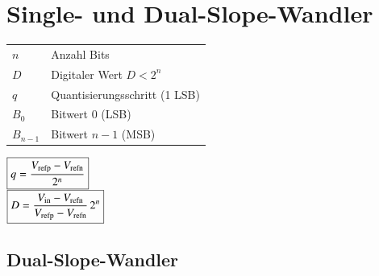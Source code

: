 
\section{Single- und Dual-Slope-Wandler}

\begin{minipage}{0.68\linewidth}
    \begin{tabular}{ll}
        $n$ & Anzahl Bits \\
        $D$ & Digitaler Wert \quad $D < 2^n$ \\
        $q$ & Quantisierungsschritt (1 LSB) \\
        $B_0$ & Bitwert 0 (LSB) \\
        $B_{n-1}$ & Bitwert $n-1$ (MSB)
    \end{tabular}
\end{minipage}
\hfill
\begin{minipage}{0.3\linewidth}
    $ \boxed{ q = \frac{V_{\rm refp} - V_{\rm refn}}{2^n} } $ \\
    $ \boxed{ D = \frac{V_{\rm in} - V_{\rm refn}}{V_{\rm refp} - V_{\rm refn}} \, 2^n }  $
\end{minipage}


\subsection{Dual-Slope-Wandler}

